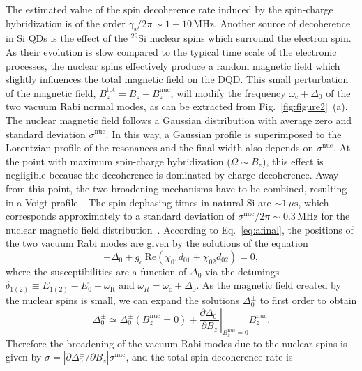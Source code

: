 \documentclass[twocolumn,english,aps,prl,preprint,reprint,showpacs,longbibliography,showkeys]{revtex4-1}
\begin{document}
The estimated value of the spin decoherence rate induced by the spin-charge hybridization is of the order $\gamma_{\mathrm{s}}/2\pi\sim 1-10\,\mathrm{MHz}$. Another source of decoherence in Si QDs is the effect of the $^{29}\mathrm{Si}$ nuclear spins which surround the electron spin. As their evolution is slow compared to the typical time scale of the electronic processes, the nuclear spins effectively produce a random magnetic field which slightly influences the total magnetic field on the DQD.
This small perturbation of the magnetic field, $B_z^{\mathrm{tot}}=B_z+B_z^{\mathrm{nuc}}$, will modify the frequency $\omega_{\mathrm{c}}+\Delta_0$ of the two vacuum Rabi normal modes, as can be extracted from Fig.~\ref{fig:figure2}~(a). The nuclear magnetic field follows a Gaussian distribution with average zero and standard deviation $\sigma^{\mathrm{nuc}}$. In this way, a Gaussian profile  is superimposed to the Lorentzian profile of the resonances and the final width also depends on $\sigma^{\mathrm{nuc}}$. At  the point with maximum spin-charge hybridization ($\Omega\sim B_z$), this effect is negligible because the decoherence is dominated by charge decoherence. Away from this point, the two broadening mechanisms have to be combined, resulting in a Voigt profile~\cite{MR2723248}. 
The spin dephasing times in natural Si are $\sim 1\,\mu \mathrm{s}$, which corresponds  approximately to a standard deviation of $\sigma^{\mathrm{nuc}}/2\pi\sim 0.3\,\mathrm{MHz}$ for the  nuclear magnetic field distribution~\cite{Kawakami2014}. 
According to Eq.~\eqref{eq:afinal}, the positions of the two vacuum Rabi modes are given by  the solutions of the equation
\begin{equation}
-\Delta_0+g_{\mathrm{c}}\,\mathrm{Re}\left(\chi_{01}d_{01}+\chi_{02}d_{02}\right)=0 ,\label{eq:Repart}
\end{equation}
where the  susceptibilities are a function of $\Delta_0$ via the detunings $\delta_{1(2)}\equiv E_{1(2)}-E_0-\omega_{\mathrm{R}}$ and $\omega_R=\omega_{\mathrm{c}}+\Delta_0$. As the  magnetic field created by the nuclear spins is small, we can expand the solutions $\Delta_0^{\pm}$ to first order to obtain
\begin{equation}
\Delta_0^{\pm}\simeq\Delta_0^{\pm} (B_z^{\mathrm{nuc}}=0)+\left.\frac{\partial\Delta_0^{\pm}}{\partial B_z}\right|_{B_z^{\mathrm{nuc}}=0}B_z^{\mathrm{nuc}} .
\end{equation}
Therefore the broadening of the vacuum Rabi modes due to the nuclear spins is given by $\sigma=\left|\partial\Delta_0^{\pm}/\partial B_z\right|\sigma^{\mathrm{nuc}}$, and the total spin decoherence rate is
\end{document}
